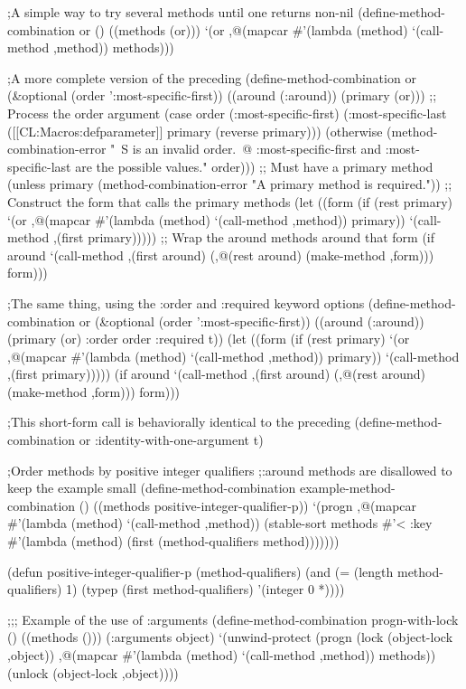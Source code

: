 ;A simple way to try several methods until one returns non-nil (define-method-combination or () ((methods (or))) `(or ,@(mapcar #'(lambda (method) `(call-method ,method)) methods)))

;A more complete version of the preceding (define-method-combination or (&optional (order ':most-specific-first)) ((around (:around)) (primary (or))) ;; Process the order argument (case order (:most-specific-first) (:most-specific-last ([[CL:Macros:defparameter]] primary (reverse primary))) (otherwise (method-combination-error "~S is an invalid order.~@ :most-specific-first and :most-specific-last are the possible values." order))) ;; Must have a primary method (unless primary (method-combination-error "A primary method is required.")) ;; Construct the form that calls the primary methods (let ((form (if (rest primary) `(or ,@(mapcar #'(lambda (method) `(call-method ,method)) primary)) `(call-method ,(first primary))))) ;; Wrap the around methods around that form (if around `(call-method ,(first around) (,@(rest around) (make-method ,form))) form)))

;The same thing, using the :order and :required keyword options (define-method-combination or (&optional (order ':most-specific-first)) ((around (:around)) (primary (or) :order order :required t)) (let ((form (if (rest primary) `(or ,@(mapcar #'(lambda (method) `(call-method ,method)) primary)) `(call-method ,(first primary))))) (if around `(call-method ,(first around) (,@(rest around) (make-method ,form))) form)))

;This short-form call is behaviorally identical to the preceding (define-method-combination or :identity-with-one-argument t)

;Order methods by positive integer qualifiers ;:around methods are disallowed to keep the example small (define-method-combination example-method-combination () ((methods positive-integer-qualifier-p)) `(progn ,@(mapcar #'(lambda (method) `(call-method ,method)) (stable-sort methods #'< :key #'(lambda (method) (first (method-qualifiers method)))))))

(defun positive-integer-qualifier-p (method-qualifiers) (and (= (length method-qualifiers) 1) (typep (first method-qualifiers) '(integer 0 *))))

;;; Example of the use of :arguments (define-method-combination progn-with-lock () ((methods ())) (:arguments object) `(unwind-protect (progn (lock (object-lock ,object)) ,@(mapcar #'(lambda (method) `(call-method ,method)) methods)) (unlock (object-lock ,object))))


